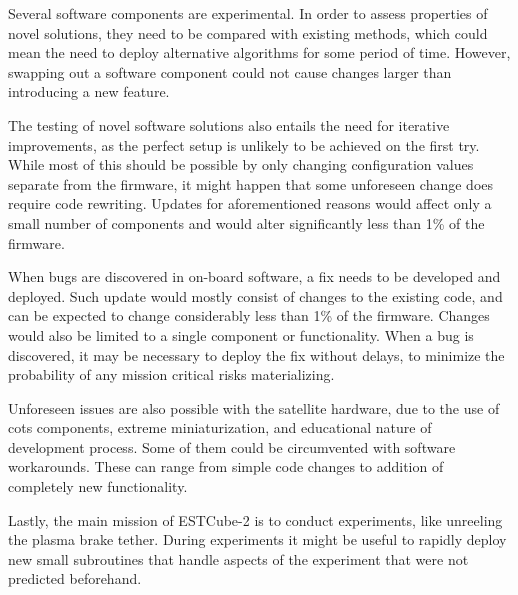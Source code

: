 Several software components are experimental. In order to assess properties of novel solutions, they need to be compared with existing methods, which could mean the need to deploy alternative algorithms for some period of time. However, swapping out a software component could not cause changes larger than introducing a new feature.

The testing of novel software solutions also entails the need for iterative improvements, as the perfect setup is unlikely to be achieved on the first try. While most of this should be possible by only changing configuration values separate from the firmware, it might happen that some unforeseen change does require code rewriting. Updates for aforementioned reasons would affect only a small number of components and would alter significantly less than 1\% of the firmware.

When bugs are discovered in on-board software, a fix needs to be developed and deployed. Such update would mostly consist of changes to the existing code, and can be expected to change considerably less than 1\% of the firmware. Changes would also be limited to a single component or functionality. When a bug is discovered, it may be necessary to deploy the fix without delays, to minimize the probability of any mission critical risks materializing.

Unforeseen issues are also possible with the satellite hardware, due to the use of \gls{cots} components, extreme miniaturization, and educational nature of development process. Some of them could be circumvented with software workarounds. These can range from simple code changes to addition of completely new functionality.

Lastly, the main mission of ESTCube-2 is to conduct experiments, like unreeling the plasma brake tether. During experiments it might be useful to rapidly deploy new small subroutines that handle aspects of the experiment that were not predicted beforehand.
